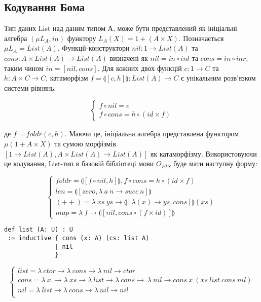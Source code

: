\newpage
\subsection{Кодування Бома}
Тип даних List над даним типом А, може бути представлений як ініціальні алгебра
$(\mu L_A, in)$ функтору $L_A(X) = 1 + (A \times X)$. Позначається $\mu L_A = List(A)$.
Функції-конструктори $nil: 1 \rightarrow List(A)$ та
$cons: A \times List(A) \rightarrow List(A)$ визначені як
$nil = in \circ inl$ та $cons = in \circ inr$, таким чином $in = [nil,cons]$.
Для кожних двох функцій $c: 1 \rightarrow C$ та $h: A \times C \rightarrow C$,
катаморфізм $f = \llparenthesis [c,h] \rrparenthesis : List(A) \rightarrow C$
є унікальним розв'язком системи рівнянь:

$$
\begin{cases}
  f \circ nil  = c \\
  f \circ cons = h \circ (id \times f)
\end{cases}
$$

де $f = foldr(c,h)$. Маючи це, ініціальна алгебра представлена функтором
$\mu (1 + A \times X)$ та сумою морфізмів
$[1 \rightarrow List(A), A \times List(A) \rightarrow List(A)]$
як катаморфізму. Використовуючи це кодування, List-тип в базовій бібліотеці мови $O_{PTS}$
буде мати наступну форму:

$$
\begin{cases}
 foldr = \llparenthesis [ f \circ nil , h] \rrparenthesis, f \circ cons = h \circ (id \times f)\\
 len = \llparenthesis [ zero, \lambda\ a\ n \rightarrow succ\ n ] \rrparenthesis \\
 (++) = \lambda\ xs\ ys \rightarrow \llparenthesis [ \lambda (x) \rightarrow ys, cons ] \rrparenthesis (xs) \\
 map = \lambda\ f \rightarrow \llparenthesis [ nil, cons \circ (f \times id)] \rrparenthesis
\end{cases}
$$

\begin{lstlisting}[mathescape=true]
def list (A: U) : U
 := inductive { cons (x: A) (cs: list A)
              | nil
              }
\end{lstlisting}

$$
\begin{cases}
list = \lambda\ ctor \rightarrow \lambda\ cons \rightarrow \lambda\ nil \rightarrow ctor\\
cons = \lambda\ x\ \rightarrow \lambda\ xs \rightarrow \lambda\ list \rightarrow \lambda\ cons \rightarrow\ \lambda\ nil \rightarrow cons\ x\ (xs\ list\ cons\ nil)\\
nil = \lambda\ list \rightarrow \lambda\ cons \rightarrow \lambda\ nil \rightarrow nil\\
\end{cases}
$$

